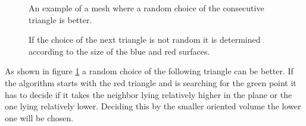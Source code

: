 \documentclass[10pt]{article}
\begin{document}
\begin{figure}[h]  \label{ex}

		\caption{An example of a mesh where a random choice of the consecutive triangle is better.}
		\caption{If the choice of the next triangle is not random it is determined according to the size of the blue and red surfaces.  }
	

	
\end{figure}
As shown in figure \ref{ex} a random choice of the following triangle can be better. If the algorithm starts with the red triangle and is searching for the green point it has to decide if it takes the neighbor lying relatively higher in the plane or the one lying relatively lower. Deciding this by the smaller oriented volume the lower one will be chosen. 
\end{document}

